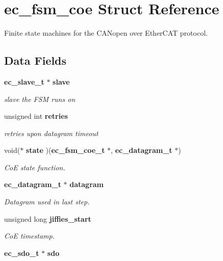 \section{ec\-\_\-fsm\-\_\-coe \-Struct \-Reference}
\label{structec__fsm__coe}


\-Finite state machines for the \-C\-A\-Nopen over \-Ether\-C\-A\-T protocol.  


\subsection*{\-Data \-Fields}
\begin{DoxyCompactItemize}
\item 
{\bf ec\-\_\-slave\-\_\-t} $\ast$ {\bf slave}\label{structec__fsm__coe_a52d4a5703f091adfb825f6a9c313cee3}

\begin{DoxyCompactList}\small\item\em slave the \-F\-S\-M runs on \end{DoxyCompactList}\item 
unsigned int {\bf retries}\label{structec__fsm__coe_aeb93652dd379136a6db678b3b46add0f}

\begin{DoxyCompactList}\small\item\em retries upon datagram timeout \end{DoxyCompactList}\item 
void($\ast$ {\bf state} )({\bf ec\-\_\-fsm\-\_\-coe\-\_\-t} $\ast$, {\bf ec\-\_\-datagram\-\_\-t} $\ast$)\label{structec__fsm__coe_a2a82055fe216c468d8dcb1bba760fd5a}

\begin{DoxyCompactList}\small\item\em \-Co\-E state function. \end{DoxyCompactList}\item 
{\bf ec\-\_\-datagram\-\_\-t} $\ast$ {\bf datagram}
\begin{DoxyCompactList}\small\item\em \-Datagram used in last step. \end{DoxyCompactList}\item 
unsigned long {\bf jiffies\-\_\-start}
\begin{DoxyCompactList}\small\item\em \-Co\-E timestamp. \end{DoxyCompactList}\item 
{\bf ec\-\_\-sdo\-\_\-t} $\ast$ {\bf sdo}\label{structec__fsm__coe_a05afb369519ffb1dd6c0df68a4c6a127}


\end{DoxyCompactItemize}
